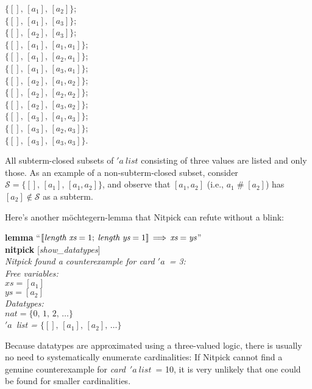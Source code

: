 \documentclass[a4paper,12pt]{article}
\def\unr{\ldots}
\begin{document}
\prew
\begin{multicols}{3}
$\{[],\, [a_1],\, [a_2]\}$; \\
$\{[],\, [a_1],\, [a_3]\}$; \\
$\{[],\, [a_2],\, [a_3]\}$; \\
$\{[],\, [a_1],\, [a_1, a_1]\}$; \\
$\{[],\, [a_1],\, [a_2, a_1]\}$; \\
$\{[],\, [a_1],\, [a_3, a_1]\}$; \\
$\{[],\, [a_2],\, [a_1, a_2]\}$; \\
$\{[],\, [a_2],\, [a_2, a_2]\}$; \\
$\{[],\, [a_2],\, [a_3, a_2]\}$; \\
$\{[],\, [a_3],\, [a_1, a_3]\}$; \\
$\{[],\, [a_3],\, [a_2, a_3]\}$; \\
$\{[],\, [a_3],\, [a_3, a_3]\}$.
\end{multicols}
\postw

\smallskipamount %

All subterm-closed subsets of $'a~\textit{list}$ consisting of three values
are listed and only those. As an example of a non-subterm-closed subset,
consider $\mathcal{S} = \{[],\, [a_1],\,\allowbreak [a_1, a_2]\}$, and observe
that $[a_1, a_2]$ (i.e., $a_1 \mathbin{\#} [a_2]$) has $[a_2] \notin
\mathcal{S}$ as a subterm.

Here's another m\"ochtegern-lemma that Nitpick can refute without a blink:

\prew
\textbf{lemma} ``$\mathopen{[\![} \textit{length}~\textit{xs} = 1;\> \textit{length}~\textit{ys} = 1
\mathclose{]\!]} \,\Longrightarrow\, \textit{xs} = \textit{ys}$''
\\
\textbf{nitpick} [\textit{show\_datatypes}] \\[2\smallskipamount]
\slshape Nitpick found a counterexample for \textit{card} $'a$~= 3: \\[2\smallskipamount]
\hbox{}\qquad Free variables: \nopagebreak \\
\hbox{}\qquad\qquad $\textit{xs} = [a_1]$ \\
\hbox{}\qquad\qquad $\textit{ys} = [a_2]$ \\
\hbox{}\qquad Datatypes: \\
\hbox{}\qquad\qquad $\textit{nat} = \{0,\, 1,\, 2,\, \unr\}$ \\
\hbox{}\qquad\qquad $'a$~\textit{list} = $\{[],\, [a_1],\, [a_2],\, \unr\}$
\postw

Because datatypes are approximated using a three-valued logic, there is usually
no need to systematically enumerate cardinalities: If Nitpick cannot find a
genuine counterexample for \textit{card}~$'a~\textit{list}$~= 10, it is very
unlikely that one could be found for smaller cardinalities.
\end{document}
